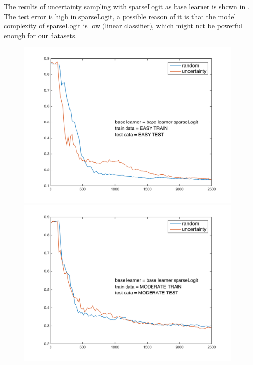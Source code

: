 \documentclass{article}
\begin{document}
The results of uncertainty sampling with sparseLogit as base learner is shown in . The test error is high in sparseLogit, a possible reason of it is that the model complexity of sparseLogit is low (linear classifier), which might not be powerful enough for our datasets.
  \begin{figure}[h]
    \begin{minipage}{.31\textwidth}
      \centering
      \includegraphics[width=1\linewidth]{../sparseLogit_simple}
    \end{minipage}
    \hfill
    \begin{minipage}{.31\textwidth}
      \centering
      \includegraphics[width=1\linewidth]{../sparseLogit_moderate}

\end{minipage}
\end{figure}
\end{document}

